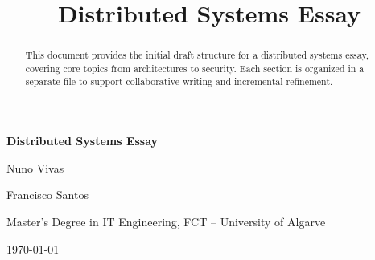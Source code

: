 \documentclass[conference]{IEEEtran}
\title{Distributed Systems Essay}
\author{
\IEEEauthorblockN{Nuno Vivas and Francisco Santos}
\IEEEauthorblockA{Master's Degree in IT Engineering, FCT -- University of Algarve}
}
\begin{document}
\begin{titlepage}
\thispagestyle{empty}
\centering

{\LARGE \textbf{Distributed Systems Essay} \par}
\vspace{1.5cm}

{\large Nuno Vivas \par}
{\large Francisco Santos \par}
\vspace{0.8cm}

{\large Master's Degree in IT Engineering, FCT -- University of Algarve \par}
\vfill

{\large \today \par}
\end{titlepage}

\tableofcontents
\newpage

\begin{abstract}
This document provides the initial draft structure for a distributed systems essay, covering core topics from architectures to security. Each section is organized in a separate file to support collaborative writing and incremental refinement.
\end{abstract}


















\newpage
\nocite{*}


\end{document}
